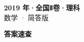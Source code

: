 \documentclass[zihao=-4, a4paper]{ctexart}
\begin{document}
\begin{center}
  {\Large\bfseries 2019 年·全国Ⅱ卷·理科}\\[4pt]
  {\large 数学 · 简答版}
\end{center}
\medskip
{}

\clearpage
{}
\begin{center}{\Large\bfseries 答案速查}\end{center}
\medskip

\end{document}
